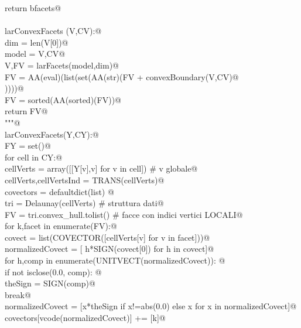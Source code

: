 \documentclass[11pt,oneside]{article}	%
\begin{document}
\begin{flushleft}
\begin{list}{}{}
\mbox{}\verb@   return bfacets@\\
\mbox{}\verb@@\\
\mbox{}\verb@def larConvexFacets (V,CV):@\\
\mbox{}\verb@   dim = len(V[0])@\\
\mbox{}\verb@   model = V,CV@\\
\mbox{}\verb@   V,FV = larFacets(model,dim)@\\
\mbox{}\verb@   FV = AA(eval)(list(set(AA(str)(FV + convexBoundary(V,CV)@\\
\mbox{}\verb@         ))))@\\
\mbox{}\verb@   FV = sorted(AA(sorted)(FV))@\\
\mbox{}\verb@   return FV@\\
\mbox{}\verb@"""@\\
\mbox{}\verb@def larConvexFacets(Y,CY):@\\
\mbox{}\verb@   FY = set()@\\
\mbox{}\verb@   for cell in CY:@\\
\mbox{}\verb@      cellVerts = array([[Y[v],v] for v in cell])     # v globale@\\
\mbox{}\verb@      cellVerts,cellVertsInd = TRANS(cellVerts)@\\
\mbox{}\verb@      covectors = defaultdict(list) @\\
\mbox{}\verb@      tri = Delaunay(cellVerts)   # struttura dati@\\
\mbox{}\verb@      FV = tri.convex_hull.tolist()   # facce con indici vertici LOCALI@\\
\mbox{}\verb@      for k,facet in enumerate(FV):@\\
\mbox{}\verb@         covect = list(COVECTOR([cellVerts[v] for v in facet]))@\\
\mbox{}\verb@         normalizedCovect = [ h*SIGN(covect[0])  for h in covect]@\\
\mbox{}\verb@         for h,comp in enumerate(UNITVECT(normalizedCovect)): @\\
\mbox{}\verb@            if not isclose(0.0, comp): @\\
\mbox{}\verb@               theSign = SIGN(comp)@\\
\mbox{}\verb@               break@\\
\mbox{}\verb@         normalizedCovect = [x*theSign  if x!=abs(0.0) else x for x in normalizedCovect]@\\
\mbox{}\verb@         covectors[vcode(normalizedCovect)] += [k]@\\

\end{list}
\end{flushleft}
\end{document}
